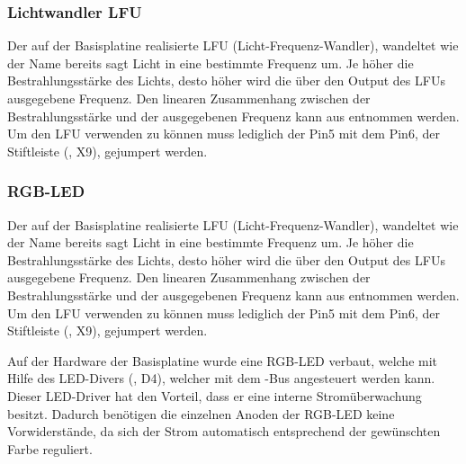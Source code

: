 
\subsubsection{Lichtwandler LFU}
Der auf der \gls{Basisplatine} realisierte LFU (Licht-Frequenz-Wandler), wandeltet wie der Name bereits sagt Licht in eine bestimmte Frequenz um. Je höher die Bestrahlungsstärke des Lichts, desto höher wird die über den Output des LFUs ausgegebene Frequenz. Den linearen Zusammenhang zwischen der Bestrahlungsstärke und der ausgegebenen Frequenz kann aus  entnommen werden. Um den LFU verwenden zu können muss lediglich der Pin5 mit dem Pin6, der Stiftleiste (, X9), gejumpert werden.


\subsubsection{RGB-LED}
Der auf der \gls{Basisplatine} realisierte LFU (Licht-Frequenz-Wandler), wandeltet wie der Name bereits sagt Licht in eine bestimmte Frequenz um. Je höher die Bestrahlungsstärke des Lichts, desto höher wird die über den Output des LFUs ausgegebene Frequenz. Den linearen Zusammenhang zwischen der Bestrahlungsstärke und der ausgegebenen Frequenz kann aus  entnommen werden. Um den LFU verwenden zu können muss lediglich der Pin5 mit dem Pin6, der Stiftleiste (, X9), gejumpert werden.

Auf der Hardware der \gls{Basisplatine} wurde eine RGB-LED verbaut, welche mit Hilfe des LED-Divers (, D4), welcher mit dem \IIC{}-Bus angesteuert werden kann. Dieser LED-Driver hat den Vorteil, dass er eine interne Stromüberwachung besitzt. Dadurch benötigen die einzelnen Anoden der RGB-LED keine Vorwiderstände, da sich der Strom automatisch entsprechend der gewünschten Farbe reguliert.


